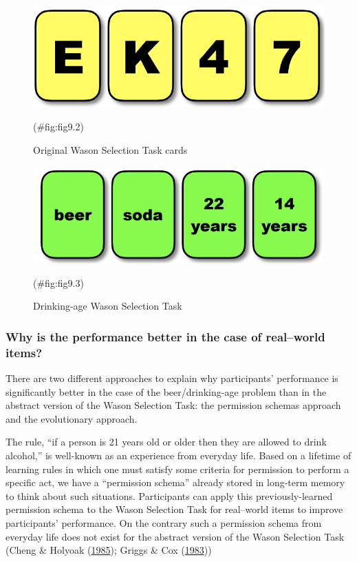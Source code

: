 \documentclass[
]{krantz}
\begin{document}
\begin{figure}

{\centering \includegraphics[width=0.6\linewidth]{images/ch9/fig2} 

}

\caption{Original Wason Selection Task cards}(\#fig:fig9.2)
\end{figure}

\begin{figure}

{\centering \includegraphics[width=0.6\linewidth]{images/ch9/fig3} 

}

\caption{Drinking-age Wason Selection Task}(\#fig:fig9.3)
\end{figure}

\hypertarget{why-is-the-performance-better-in-the-case-of-realworld-items}{%
\subsubsection*{Why is the performance better in the case of real--world items?}\label{why-is-the-performance-better-in-the-case-of-realworld-items}}


There are two different approaches to explain why participants' performance is significantly better in the case of the beer/drinking-age problem than in the abstract version of the Wason Selection Task: the permission schemas approach and the evolutionary approach.

The rule, ``if a person is 21 years old or older then they are allowed to drink alcohol,'' is well-known as an experience from everyday life. Based on a lifetime of learning rules in which one must satisfy some criteria for permission to perform a specific act, we have a ``permission schema'' already stored in long-term memory to think about such situations. Participants can apply this previously-learned permission schema to the Wason Selection Task for real--world items to improve participants' performance. On the contrary such a permission schema from everyday life does not exist for the abstract version of the Wason Selection Task (Cheng \& Holyoak (\protect\hyperlink{ref-cheng1985pragmatic}{1985}); Griggs \& Cox (\protect\hyperlink{ref-griggs1983effects}{1983}))
\end{document}
